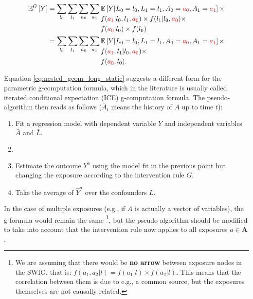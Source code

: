\documentclass[12pt,twoside]{article}
\begin{document}
\begin{align}
    \mathbb{E}^G \left[ Y \right]
    &= \sum_{l_0} \sum_{l_1} \sum_{a_0} \sum_{a_1}
    \!\begin{aligned}[t]
        &\mathbb{E} \left[ Y|L_0=l_0,L_1=l_1,A_0=\textcolor{red}{a_0},A_1=\textcolor{red}{a_1} \right] \times \\
        &f(\textcolor{red}{a_1}|l_0,l_1,\textcolor{red}{a_0}) \times f(l_1|l_0,\textcolor{red}{a_0}) \times \\
        &f(\textcolor{red}{a_0}|l_0) \times f(l_0)
    \end{aligned} \\
    &= \sum_{l_0} \sum_{l_1} \sum_{a_0} \sum_{a_1}
    \!\begin{aligned}[t] \label{eq:nested_gcom_long_static}
        &\mathbb{E} \left[ Y|L_0=l_0,L_1=l_1,A_0=\textcolor{red}{a_0},A_1=\textcolor{red}{a_1} \right] \times \\
        &f(\textcolor{red}{a_1},l_1|l_0,\textcolor{red}{a_0}) \times \\
        &f(\textcolor{red}{a_0},l_0).
    \end{aligned}
\end{align}

Equation \ref{eq:nested_gcom_long_static} suggests a different form for the parametric g-computation formula, which in the literature is usually called iterated conditional expectation (ICE) g-computation formula. The pseudo-algorithm then reads as follows ($\bar{A}_t$ means the history of $A$ up to time $t$):

\begin{enumerate}
    \item Fit a regression model with dependent variable $Y$ and independent variables $\bar{A}$ and $\bar{L}$.
    \item 
    \item Estimate the outcome $Y^a$ using the model fit in the previous point but changing the exposure according to the intervention rule $G$.
    \item Take the average of $\hat{Y}^a$ over the confounders $L$.
\end{enumerate}

In the case of multiple exposures (e.g., if $A$ is actually a vector of variables), the g-formula would remain the same \footnote{We are assuming that there would be \textbf{no arrow} between exposure nodes in the SWIG, that is: $f(a_1,a_2|l) = f(a_1|l) \times f(a_2|l)$. This means that the correlation between them is due to e.g., a common source, but the exposures themselves are not causally related.}, but the pseudo-algorithm should be modified to take into account that the intervention rule now applies to all exposures $a \in \mathbf{A}$.
\end{document}
